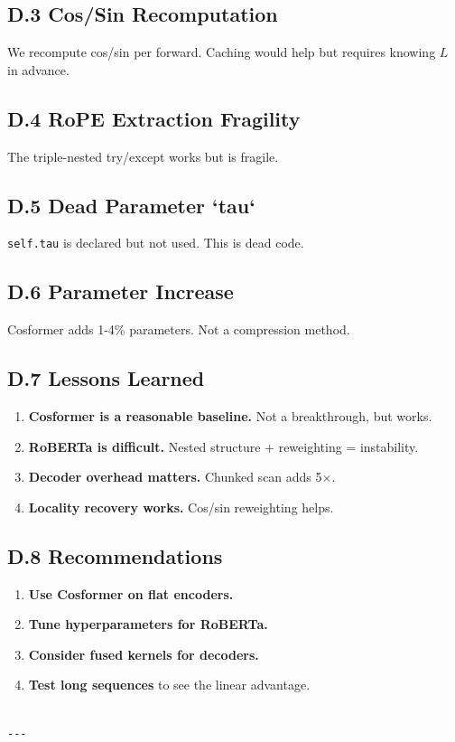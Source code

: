 \subsection{D.3 Cos/Sin Recomputation}

We recompute cos/sin per forward. Caching would help but requires knowing 
$L$ in advance.

\subsection{D.4 RoPE Extraction Fragility}

The triple-nested try/except works but is fragile.

\subsection{D.5 Dead Parameter `tau`}

\texttt{self.tau} is declared but not used. This is dead code.

\subsection{D.6 Parameter Increase}

Cosformer adds 1-4\% parameters. Not a compression method.

\subsection{D.7 Lessons Learned}

\begin{enumerate}
\item \textbf{Cosformer is a reasonable baseline.} Not a breakthrough, but works.
\item \textbf{RoBERTa is difficult.} Nested structure + reweighting = instability.
\item \textbf{Decoder overhead matters.} Chunked scan adds 5$\times$.
\item \textbf{Locality recovery works.} Cos/sin reweighting helps.

\end{enumerate}
\subsection{D.8 Recommendations}

\begin{enumerate}
\item \textbf{Use Cosformer on flat encoders.}
\item \textbf{Tune hyperparameters for RoBERTa.}
\item \textbf{Consider fused kernels for decoders.}
\item \textbf{Test long sequences} to see the linear advantage.
\end{enumerate}
\begin{lstlisting}

---
\end{lstlisting}


